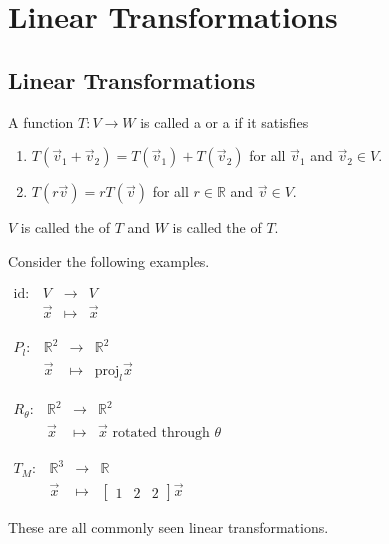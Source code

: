 \documentclass[11pt,fleqn]{book} %
\begin{document}
\chapter{Linear Transformations}

\section{Linear Transformations}

\begin{definition}
    A function $T: V \to W$ is called a  or a  if it satisfies
    
    \begin{enumerate}[label=\roman*)]
        \item $T(\vec{v}_1 + \vec{v}_2) = T(\vec{v}_1) + T(\vec{v}_2)$ for all $\vec{v}_1$ and $\vec{v}_2 \in V$. 
        \item $T(r\vec{v}) = rT(\vec{v})$ for all $r \in \mathbb{R}$ and $\vec{v} \in V$. 
    \end{enumerate}
    
    $V$ is called the  of $T$ and $W$ is called the  of $T$.
\end{definition}

\begin{example} Consider the following examples. 

\begin{minipage}[t]{0.45\linewidth}
    $\begin{matrix} \mathrm{id}: &V &\to &V \\ &\vec{x} &\mapsto &\vec{x} \end{matrix}$
    
    $\begin{matrix} P_l: &\mathbb{R}^2 &\to &\mathbb{R}^2 \\ &\vec{x} &\mapsto &\mathrm{proj}_l\vec{x} \end{matrix}$
\end{minipage}
\begin{minipage}[t]{0.45\linewidth}
    $\begin{matrix} R_{\theta}: &\mathbb{R}^2 &\to &\mathbb{R}^2 \\ &\vec{x} &\mapsto &\vec{x}\text{ rotated through }\theta \end{matrix}$
    
    $\begin{matrix} T_M: &\mathbb{R}^3 &\to &\mathbb{R} \\ &\vec{x} &\mapsto &\begin{bmatrix} 1&2&2 \end{bmatrix}\vec{x} \end{matrix}$
\end{minipage}

These are all commonly seen linear transformations. 
\end{example}
\end{document}
